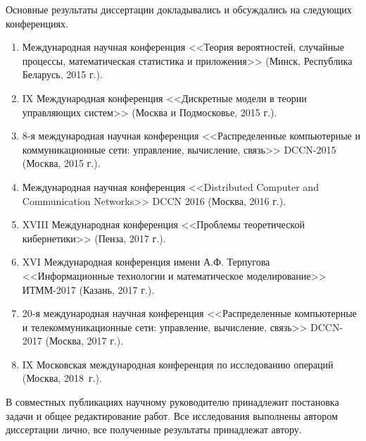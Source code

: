 Основные результаты диссертации докладывались и обсуждались на следующих  конференциях.
\begin{enumerate}
    \item Международная научная конференция <<Теория вероятностей, случайные процессы, математическая статистика и приложения>> (Минск, Республика Беларусь, 2015 г.).
    \item IX Международная конференция <<Дискретные модели в теории управляющих систем>> (Москва и Подмосковье, 2015 г.).
\item 8-я международная научная конференция <<Распределенные компьютерные и коммуникационные сети: управление, вычисление, связь>> DCCN-2015 (Москва, 2015 г.).
\item Международная научная конференция <<Distributed Computer and Communication Networks>> DCCN 2016 (Москва, 2016 г.).
\item XVIII Международная конференция <<Проблемы теоретической кибернетики>> (Пенза, 2017 г.).
\item XVI Международная конференция имени А.Ф. Терпугова <<Информационные технологии и математическое моделирование>> ИТММ-2017 (Казань, 2017 г.).
\item  20-я международная научная конференция <<Распределенные компьютерные и телекоммуникационные сети: управление, вычисление, связь>> DCCN-2017 (Москва, 2017 г.).
\item IX Московская международная конференция по исследованию операций (Москва, 2018~г.).
\end{enumerate}


{\contribution} В совместных публикациях научному руководителю принадлежит постановка задачи и общее редактирование работ. Все исследования выполнены автором диссертации лично, все полученные результаты принадлежат автору. 


